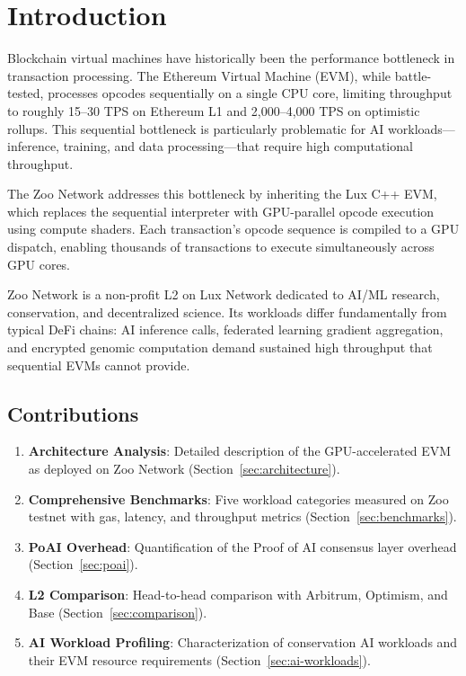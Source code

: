 \section{Introduction}


Blockchain virtual machines have historically been the performance bottleneck in transaction processing. The Ethereum Virtual Machine (EVM), while battle-tested, processes opcodes sequentially on a single CPU core, limiting throughput to roughly 15--30 TPS on Ethereum L1 and 2,000--4,000 TPS on optimistic rollups. This sequential bottleneck is particularly problematic for AI workloads---inference, training, and data processing---that require high computational throughput.

The Zoo Network addresses this bottleneck by inheriting the Lux C++ EVM, which replaces the sequential interpreter with GPU-parallel opcode execution using compute shaders. Each transaction's opcode sequence is compiled to a GPU dispatch, enabling thousands of transactions to execute simultaneously across GPU cores.

Zoo Network is a non-profit L2 on Lux Network dedicated to AI/ML research, conservation, and decentralized science. Its workloads differ fundamentally from typical DeFi chains: AI inference calls, federated learning gradient aggregation, and encrypted genomic computation demand sustained high throughput that sequential EVMs cannot provide.

\subsection{Contributions}

\begin{enumerate}
    \item \textbf{Architecture Analysis}: Detailed description of the GPU-accelerated EVM as deployed on Zoo Network (Section~\ref{sec:architecture}).

    \item \textbf{Comprehensive Benchmarks}: Five workload categories measured on Zoo testnet with gas, latency, and throughput metrics (Section~\ref{sec:benchmarks}).

    \item \textbf{PoAI Overhead}: Quantification of the Proof of AI consensus layer overhead (Section~\ref{sec:poai}).

    \item \textbf{L2 Comparison}: Head-to-head comparison with Arbitrum, Optimism, and Base (Section~\ref{sec:comparison}).

    \item \textbf{AI Workload Profiling}: Characterization of conservation AI workloads and their EVM resource requirements (Section~\ref{sec:ai-workloads}).
\end{enumerate}

